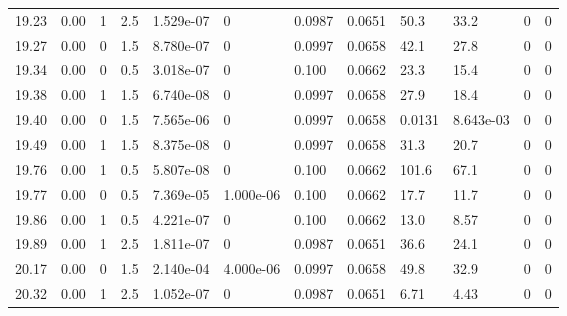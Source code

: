 \documentclass[preview]{standalone}
\begin{document}
{{{{\begin{tabular}{L{1.2cm}C{1.2cm} C{0.3cm}C{0.5cm} C{1.4cm}C{1.4cm} C{1.4cm}C{1.4cm} C{1.6cm}C{1.6cm} C{1.6cm}C{1.6cm}}
  19.23  &  0.00  & 1     & 2.5 &  1.529e-07  & 0  &  0.0987&   0.0651& 50.3 & 33.2   &  0 & 0  \\ 
  19.27  &  0.00  & 0     & 1.5 &  8.780e-07  & 0  &  0.0997&   0.0658& 42.1 & 27.8   &  0 & 0  \\ 
  19.34  &  0.00  & 0     & 0.5 &  3.018e-07  & 0  &  0.100&   0.0662& 23.3 & 15.4   &  0 & 0  \\ 
  19.38  &  0.00  & 1     & 1.5 &  6.740e-08  & 0  &  0.0997&   0.0658& 27.9 & 18.4   &  0 & 0  \\ 
  19.40  &  0.00  & 0     & 1.5 &  7.565e-06  & 0  &  0.0997&   0.0658& 0.0131 & 8.643e-03   &  0 & 0  \\ 
  19.49  &  0.00  & 1     & 1.5 &  8.375e-08  & 0  &  0.0997&   0.0658& 31.3 & 20.7   &  0 & 0  \\ 
  19.76  &  0.00  & 1     & 0.5 &  5.807e-08  & 0  &  0.100&   0.0662& 101.6 & 67.1   &  0 & 0  \\ 
  19.77  &  0.00  & 0     & 0.5 &  7.369e-05  & 1.000e-06  &  0.100&   0.0662& 17.7 & 11.7   &  0 & 0  \\ 
  19.86  &  0.00  & 1     & 0.5 &  4.221e-07  & 0  &  0.100&   0.0662& 13.0 & 8.57   &  0 & 0  \\ 
  19.89  &  0.00  & 1     & 2.5 &  1.811e-07  & 0  &  0.0987&   0.0651& 36.6 & 24.1   &  0 & 0  \\ 
  20.17  &  0.00  & 0     & 1.5 &  2.140e-04  & 4.000e-06  &  0.0997&   0.0658& 49.8 & 32.9   &  0 & 0  \\ 
  20.32  &  0.00  & 1     & 2.5 &  1.052e-07  & 0  &  0.0987&   0.0651& 6.71 & 4.43   &  0 & 0  \\ 
\hline 
\end{tabular} 

}}}}
\end{document}
